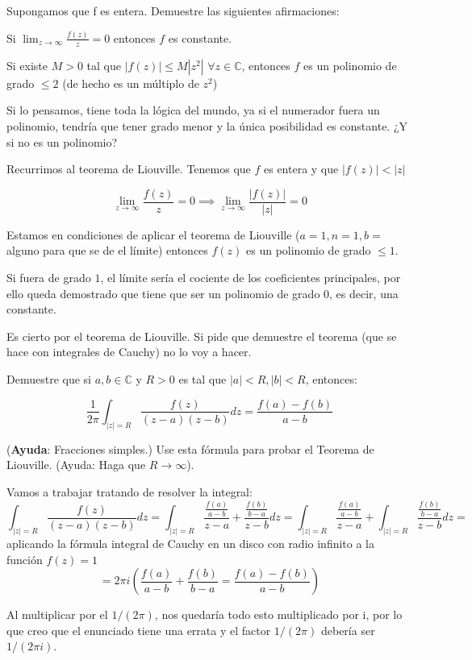 \begin{problem}[9]
Supongamos que f es entera. Demuestre las siguientes afirmaciones:

\ppart Si $\displaystyle \lim_{z\to ∞} \frac{f(z)}{z} = 0$ entonces $f$ es constante.

\ppart Si existe $M>0$ tal que $|f(z)| \leq M |z^2|$ $∀z∈ℂ$, entonces $f$ es un polinomio de grado $\leq 2$ (de hecho es un múltiplo de $z^2$)
\solution


\spart Si lo pensamos, tiene toda la lógica del mundo, ya si el numerador fuera un polinomio, tendría que tener grado menor y la única posibilidad es constante. ¿Y si no es un polinomio?

Recurrimos al teorema de Liouville. Tenemos que $f$ es entera y que $|f(z)| < |z|$

\[
\lim_{z\to ∞} \frac{f(z)}{z}=0 \implies \lim_{z\to ∞} \frac{|f(z)|}{|z|} = 0
\]

Estamos en condiciones de aplicar el teorema de Liouville ($a=1,n=1,b=$alguno para que se de el límite) entonces $f(z)$ es un polinomio de grado $\leq 1$.

Si fuera de grado $1$, el límite sería el cociente de los coeficientes principales, por ello queda demostrado que tiene que ser un polinomio de grado 0, es decir, una constante.

\spart Es cierto por el teorema de Liouville. Si pide que demuestre el teorema (que se hace con integrales de Cauchy) no lo voy a hacer.

\end{problem}


\begin{problem}[10]
Demuestre que si $a,b∈ℂ$ y $R>0$ es tal que $|a| < R, |b| < R$, entonces:

\[
\frac{1}{2π}\int_{|z| = R} \frac{f(z)}{(z-a)(z-b)} dz = \frac{f(a) - f(b)}{a-b}
\]

(\textbf{Ayuda}: Fracciones simples.) Use esta fórmula para probar el Teorema de Liouville. (Ayuda: Haga que $R \to \infty$).

\solution
{}

Vamos a trabajar tratando de resolver la integral:
\[\int_{|z| = R} \frac{f(z)}{(z-a)(z-b)} dz = \int_{|z| = R} \frac{\frac{f(a)}{a-b}}{z-a}+\frac{\frac{f(b)}{b-a}}{z-b}dz=\int_{|z| = R} \frac{\frac{f(a)}{a-b}}{z-a}+\int_{|z| = R}\frac{\frac{f(b)}{b-a}}{z-b}dz=\]
aplicando la fórmula integral de Cauchy en un disco con radio infinito a la función $f(z)=1$
\[=2πi\left(\frac{f(a)}{a-b}+\frac{f(b)}{b-a}=\frac{f(a)-f(b)}{a-b}\right)\]

Al multiplicar por el $1/(2π)$, nos quedaría todo esto multiplicado por i, por lo que creo que el enunciado tiene una errata y el factor $1/(2π)$ debería ser $1/(2πi)$.
\end{problem}

